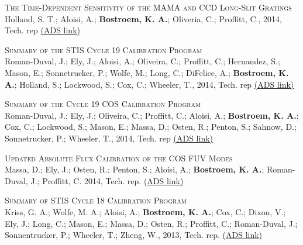 \begin{revnumerate}[24]
\item{\textsc{The Time-Dependent Sensitivity of the MAMA and CCD Long-Slit Gratings}\\
Holland, S. T.; Aloisi, A.; {\bf Bostroem, K. A.}; Oliveria, C.; Proffitt, C.,  2014, Tech. rep 
\color{blue}\href{https://ui.adsabs.harvard.edu/abs/2014stis.rept....2H/abstract}{(ADS link)}\color{black}}\\ %

\item{\textsc{Summary of the STIS Cycle 19 Calibration Program}\\
Roman-Duval, J.; Ely, J.; Aloisi, A.; Oliveira, C.; Proffitt, C.; Hernandez, S.; Mason, E.; Sonnetrucker, P.; Wolfe, M.; Long, C.; DiFelice, A.; \textbf{Bostroem, K. A.}; Holland, S.; Lockwood, S.; Cox, C.; Wheeler, T., 2014, Tech. rep 
\color{blue}\href{https://ui.adsabs.harvard.edu/abs/2014stis.rept....1R/abstract}{(ADS link)}\color{black}}\\ %

\item{\textsc{Summary of the Cycle 19 COS Calibration Program}\\
Roman-Duval, J.; Ely, J.; Oliveira, C.; Proffitt, C.; Aloisi, A.; \textbf{Bostroem, K. A.}; Cox, C.; Lockwood, S.; Mason, E.; Massa, D.; Osten, R.; Penton, S.; Sahnow, D.; Sonnetrucker, P.; Wheeler, T., 2014, Tech. rep 
\color{blue}\href{https://ui.adsabs.harvard.edu/abs/2014cos..rept....1R/abstract}{(ADS link)}\color{black}}\\ %

\item{\textsc{Updated Absolute Flux Calibration of the COS FUV Modes}\\
Massa, D.; Ely, J.; Osten, R.; Penton, S.; Aloisi, A.; \textbf{Bostroem, K. A.}; Roman-Duval, J.; Proffitt, C. 2014, Tech. rep. 
\color{blue}\href{https://ui.adsabs.harvard.edu/abs/2014cos..rept....9M/abstract}{(ADS link)}\color{black}}\\ %

\item{\textsc{Summary of STIS Cycle 18 Calibration Program}\\
Kriss, G. A.; Wolfe, M. A.; Aloisi, A.; \textbf{Bostroem, K. A.}; Cox, C.; Dixon, V.; Ely, J.; Long, C.; Mason, E.; Massa, D.; Osten, R.; Proffitt, C.; Roman-Duval, J.; Sonnentrucker, P.; Wheeler, T.; Zheng, W., 2013, Tech. rep. 
\color{blue}\href{https://ui.adsabs.harvard.edu/abs/2013stis.rept....3K/abstract}{(ADS link)}\color{black}}\\ %


\end{revnumerate}
